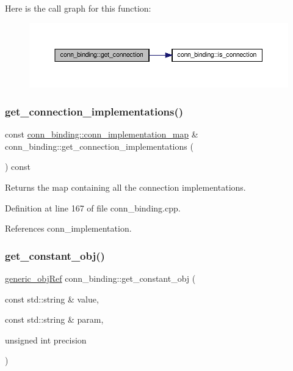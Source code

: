Here is the call graph for this function\+:
\nopagebreak
\begin{figure}[H]
\begin{center}
\leavevmode
\includegraphics[width=350pt]{d2/db1/classconn__binding_a39a42582d79c8e8cb85017f32ec7c56c_cgraph}
\end{center}
\end{figure}
\mbox{\label{classconn__binding_ad5bc96e38fd8c49069bea634be25e3b0}} 
\subsubsection{\texorpdfstring{get\+\_\+connection\+\_\+implementations()}{get\_connection\_implementations()}}
{\footnotesize\ttfamily const \hyperlink{classconn__binding_a352bfe56b0a7f7b3c9763bf90c87f785}{conn\+\_\+binding\+::conn\+\_\+implementation\+\_\+map} \& conn\+\_\+binding\+::get\+\_\+connection\+\_\+implementations (\begin{DoxyParamCaption}{ }\end{DoxyParamCaption}) const}



Returns the map containing all the connection implementations. 



Definition at line 167 of file conn\+\_\+binding.\+cpp.



References conn\+\_\+implementation.

\mbox{\label{classconn__binding_ae385543cd719612dd44a8a54b3df8ad8}} 
\subsubsection{\texorpdfstring{get\+\_\+constant\+\_\+obj()}{get\_constant\_obj()}}
{\footnotesize\ttfamily \hyperlink{generic__obj_8hpp_acb533b2ef8e0fe72e09a04d20904ca81}{generic\+\_\+obj\+Ref} conn\+\_\+binding\+::get\+\_\+constant\+\_\+obj (\begin{DoxyParamCaption}\item[{const std\+::string \&}]{value,  }\item[{const std\+::string \&}]{param,  }\item[{unsigned int}]{precision }\end{DoxyParamCaption})}



